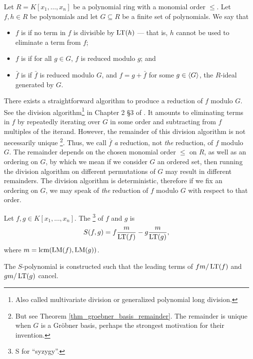 \begin{definition}
  \label{def_reduced_polynomial}
  Let $R = K[x_1, \ldots, x_n]$ be a polynomial ring with a monomial order $\leq$.
  Let $f, h \in R$ be polynomials and let $G \subseteq R$ be a finite set of polynomials.
  We say that
  \begin{itemize}
    \item $f$ is  if no term in $f$ is divisible by $\operatorname{LT}(h)$ ---
          that is, $h$ cannot be used to eliminate a term from $f$;
    \item $f$ is  if for all $g \in G$, $f$ is reduced modulo $g$; and
    \item $\bar f$ is  if $\bar f$ is reduced modulo $G$,
          and $f = g + \bar f$ for some $g \in \left\langle G \right\rangle$, the $R$-ideal generated by $G$.
  \end{itemize}
\end{definition}
There exists a straightforward algorithm to produce a reduction of $f$ modulo $G$.
See the division algorithm\footnote{Also called multivariate division or generalized polynomial long division.}
in Chapter 2 \S3 of \cite{cox07}.
It amounts to eliminating terms in $f$ by repeatedly iterating over $G$ in some order
and subtracting from $f$ multiples of the iterand.
However, the remainder of this division algorithm is not necessarily unique
\footnote{But see Theorem \ref{thm_groebner_basis_remainder}.
The remainder is unique when $G$ is a Gr\"obner basis, perhaps the strongest motivation for their invention.}.
Thus, we call $\bar f$ \emph{a} reduction, not \emph{the} reduction, of $f$ modulo $G$.
The remainder depends on the chosen monomial order $\leq$ on $R$, as well as an ordering on $G$,
by which we mean if we consider $G$ an ordered set, then running the division algorithm on different permutations of $G$
may result in different remainders.
The division algorithm is deterministic, therefore if we fix an ordering on $G$,
we may speak of \emph{the} reduction of $f$ modulo $G$ with respect to that order.

\begin{definition}
  Let $f, g \in K[x_1, \ldots, x_n]$. The \footnote{S for ``syzygy''.} of $f$ and $g$ is
  \[ S(f,g) = f \frac m {\operatorname{LT}(f)} - g \frac m {\operatorname{LT}(g)}, \]
  where $m = \operatorname{lcm}(\operatorname{LM}(f), \operatorname{LM}(g))$.
\end{definition}

The $S$-polynomial is constructed such that the leading terms of $f m / \operatorname{LT}(f)$ and $g m / \operatorname{LT}(g)$ cancel.


